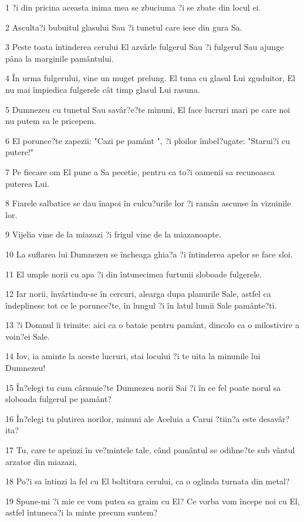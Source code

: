 \par 1 ?i din pricina aceasta inima mea se zbuciuma ?i se zbate din locul ei.
\par 2 Asculta?i bubuitul glasului Sau ?i tunetul care iese din gura Sa.
\par 3 Peste toata întinderea cerului El azvârle fulgerul Sau ?i fulgerul Sau ajunge pâna la marginile pamântului.
\par 4 În urma fulgerului, vine un muget prelung. El tuna cu glasul Lui zguduitor, El nu mai împiedica fulgerele cât timp glasul Lui rasuna.
\par 5 Dumnezeu cu tunetul Sau savâr?e?te minuni, El face lucruri mari pe care noi nu putem sa le pricepem.
\par 6 El porunce?te zapezii: "Cazi pe pamânt ", ?i ploilor îmbel?ugate: "Starui?i cu putere!"
\par 7 Pe fiecare om El pune a Sa pecetie, pentru ca to?i oamenii sa recunoasca puterea Lui.
\par 8 Fiarele salbatice se dau înapoi în culcu?urile lor ?i ramân ascunse în vizuinile lor.
\par 9 Vijelia vine de la miazazi ?i frigul vine de la miazanoapte.
\par 10 La suflarea lui Dumnezeu se încheaga ghia?a ?i întinderea apelor se face sloi.
\par 11 El umple norii cu apa ?i din întunecimea furtunii sloboade fulgerele.
\par 12 Iar norii, învârtindu-se în cercuri, alearga dupa planurile Sale, astfel ca îndeplinesc tot ce le porunce?te, în lungul ?i în latul lumii Sale pamânte?ti.
\par 13 ?i Domnul îi trimite: aici ca o bataie pentru pamânt, dincolo ca o milostivire a voin?ei Sale.
\par 14 Iov, ia aminte la aceste lucruri, stai locului ?i te uita la minunile lui Dumnezeu!
\par 15 În?elegi tu cum cârmuie?te Dumnezeu norii Sai ?i în ce fel poate norul sa sloboada fulgerul pe pamânt?
\par 16 În?elegi tu plutirea norilor, minuni ale Aceluia a Carui ?tiin?a este desavâr?ita?
\par 17 Tu, care te aprinzi în ve?mintele tale, când pamântul se odihne?te sub vântul arzator din miazazi,
\par 18 Po?i sa întinzi la fel cu El boltitura cerului, ca o oglinda turnata din metal?
\par 19 Spune-mi ?i mie ce vom putea sa graim cu El? Ce vorba vom începe noi cu El, astfel întuneca?i la minte precum suntem?
